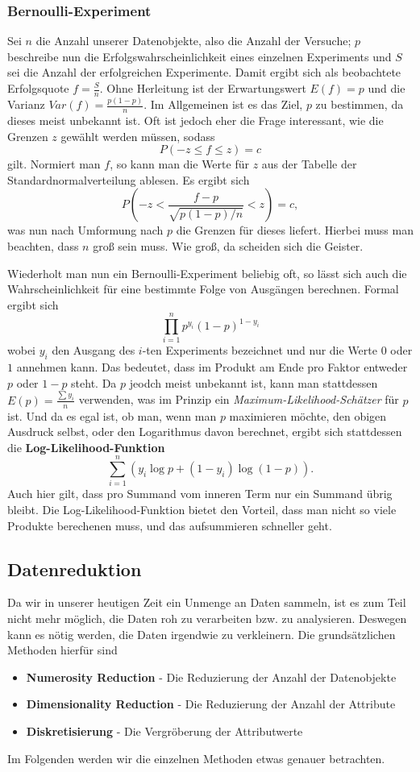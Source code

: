 \subsubsection{Bernoulli-Experiment}
Sei \(n\) die Anzahl unserer Datenobjekte,
also die Anzahl der Versuche; \(p\) beschreibe nun die Erfolgswahrscheinlichkeit
eines einzelnen Experiments und \(S\) sei die Anzahl der erfolgreichen Experimente.
Damit ergibt sich als beobachtete Erfolgsquote \(f=\frac{S}{n}\). Ohne
Herleitung ist der Erwartungswert \(E(f) = p\) und die Varianz \(Var(f)= \frac{p(1-p)}{n}\).
Im Allgemeinen ist es das Ziel, \(p\) zu bestimmen, da dieses meist unbekannt ist.
Oft ist jedoch eher die Frage interessant, wie die Grenzen \(z\) gewählt werden
müssen, sodass 
\[
	P(-z \leq f \leq z) = c
\]
gilt. Normiert man \(f\), so kann man die Werte für \(z\) aus der Tabelle
der Standardnormalverteilung ablesen. Es ergibt sich
\[
	P(-z < \frac{f-p}{\sqrt{p(1-p)/n}} < z) = c ,
\]
was nun nach Umformung nach \(p\) die Grenzen für dieses liefert. Hierbei
muss man beachten, dass \(n\) groß sein muss. Wie groß, da scheiden sich
die Geister.

Wiederholt man nun ein Bernoulli-Experiment beliebig oft, so lässt sich auch
die Wahrscheinlichkeit für eine bestimmte Folge von Ausgängen berechnen. Formal
ergibt sich
\[
	\prod\limits_{i=1}^{n} p^{y_i} (1-p)^{1-y_i}
\]
wobei \(y_i\) den Ausgang des \(i\)-ten Experiments bezeichnet und nur die Werte
\(0\) oder \(1\) annehmen kann. Das bedeutet, dass im Produkt am Ende pro Faktor
entweder \(p\) oder \(1-p\) steht. Da \(p\) jeodch meist unbekannt ist, kann man
stattdessen \(E(p) = \frac{\sum y_i}{n}\) verwenden, was im Prinzip ein 
\textit{Maximum-Likelihood-Schätzer} für \(p\) ist. Und da es egal ist, ob man,
wenn man \(p\) maximieren möchte, den obigen Ausdruck selbst, oder den Logarithmus
davon berechnet, ergibt sich stattdessen die \textbf{Log-Likelihood-Funktion}
\[
    \sum\limits_{i=1}^n (y_i \log{p} + (1-y_i)\log(1-p)).
\]
Auch hier gilt, dass pro Summand vom inneren Term nur ein Summand übrig bleibt.
Die Log-Likelihood-Funktion bietet den Vorteil, dass man nicht so viele Produkte
berechenen muss, und das aufsummieren schneller geht.


\subsection{Datenreduktion}
Da wir in unserer heutigen Zeit ein Unmenge an Daten sammeln, ist es zum Teil nicht
mehr möglich, die Daten roh zu verarbeiten bzw. zu analysieren. Deswegen kann es
nötig werden, die Daten irgendwie zu verkleinern. Die grundsätzlichen Methoden
hierfür sind
\begin{itemize}
	\item \textbf{Numerosity Reduction} - Die Reduzierung der Anzahl der Datenobjekte
	\item \textbf{Dimensionality Reduction} - Die Reduzierung der Anzahl der Attribute
	\item \textbf{Diskretisierung} - Die Vergröberung der Attributwerte
\end{itemize}
Im Folgenden werden wir die einzelnen Methoden etwas genauer betrachten.

